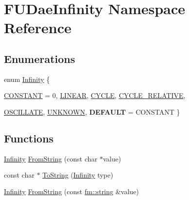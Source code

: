 \hypertarget{namespaceFUDaeInfinity}{
\section{FUDaeInfinity Namespace Reference}
\label{namespaceFUDaeInfinity}
}
\subsection*{Enumerations}
\begin{DoxyCompactItemize}
\item 
enum \hyperlink{namespaceFUDaeInfinity_a9d8fb86affe94d1586d728d4c2e89008}{Infinity} \{ \par
\hyperlink{namespaceFUDaeInfinity_a9d8fb86affe94d1586d728d4c2e89008ac57389e1772b6bda01dbd602b221df47}{CONSTANT} =  0, 
\hyperlink{namespaceFUDaeInfinity_a9d8fb86affe94d1586d728d4c2e89008a1858c6f256ea4a23240a4fedd1099d61}{LINEAR}, 
\hyperlink{namespaceFUDaeInfinity_a9d8fb86affe94d1586d728d4c2e89008a219f140587c9b90e29c73d0aa2debae9}{CYCLE}, 
\hyperlink{namespaceFUDaeInfinity_a9d8fb86affe94d1586d728d4c2e89008a9c1ce1c8dbaf7010eb813f77057260b4}{CYCLE\_\-RELATIVE}, 
\par
\hyperlink{namespaceFUDaeInfinity_a9d8fb86affe94d1586d728d4c2e89008a0d3203b302bb15b8b3e11d1e36ec10e6}{OSCILLATE}, 
\hyperlink{namespaceFUDaeInfinity_a9d8fb86affe94d1586d728d4c2e89008aefd6eeedc4578e0016ecec2ef88d7835}{UNKNOWN}, 
{\bfseries DEFAULT} =  CONSTANT
 \}
\end{DoxyCompactItemize}
\subsection*{Functions}
\begin{DoxyCompactItemize}
\item 
\hyperlink{namespaceFUDaeInfinity_a9d8fb86affe94d1586d728d4c2e89008}{Infinity} \hyperlink{namespaceFUDaeInfinity_a8b716f46671d07cc679cfeadf1a291d9}{FromString} (const char $\ast$value)
\item 
const char $\ast$ \hyperlink{namespaceFUDaeInfinity_abbb3cb1b428c493aeb71798dbcb6a24f}{ToString} (\hyperlink{namespaceFUDaeInfinity_a9d8fb86affe94d1586d728d4c2e89008}{Infinity} type)
\item 
\hyperlink{namespaceFUDaeInfinity_a9d8fb86affe94d1586d728d4c2e89008}{Infinity} \hyperlink{namespaceFUDaeInfinity_a0ffbc0c3ba1aa55aac2526cc999fc451}{FromString} (const \hyperlink{classfm_1_1stringT}{fm::string} \&value)
\end{DoxyCompactItemize}



